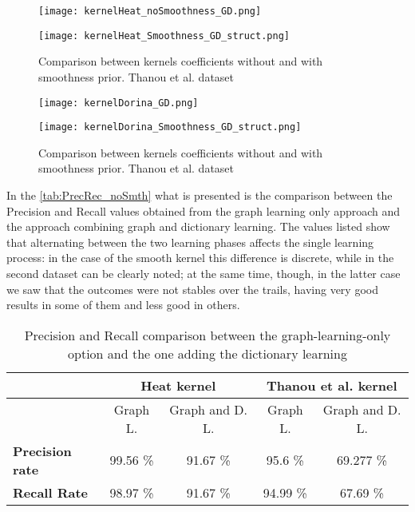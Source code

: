\begin{figure}
  \centering
  \begin{minipage}[c]{.8\textwidth}
    \centering
    \texttt{[image: kernelHeat\_noSmoothness\_GD.png]}
  \end{minipage}
  \begin{minipage}[c]{.8\textwidth}
    \centering
    \texttt{[image: kernelHeat\_Smoothness\_GD\_struct.png]}
  \end{minipage}
  \caption{Comparison between kernels coefficients without and with smoothness prior. Thanou et al.   dataset}
  \label{fig:alphaHeatGD}
\end{figure}

\begin{figure}
  \centering
  \begin{minipage}[c]{.8\textwidth}
    \centering
    \texttt{[image: kernelDorina\_GD.png]}
  \end{minipage}
  \begin{minipage}[c]{.8\textwidth}
    \centering
    \texttt{[image: kernelDorina\_Smoothness\_GD\_struct.png]}
  \end{minipage}
  \caption{Comparison between kernels coefficients without and with smoothness prior. Thanou et al. dataset}
  \label{fig:alphaDorinaGD}
\end{figure}

In the \autoref{tab:PrecRec_noSmth} what is presented is the comparison between the Precision and Recall values obtained from the graph learning only approach and the approach combining graph and dictionary learning. The values listed show that alternating between the two learning phases affects the single learning process: in the case of the smooth kernel this difference is discrete, while in the second dataset can be clearly noted; at the same time, though, in the latter case we saw that the outcomes were not stables over the trails, having very good results in some of them and less good in others.

\begin{table}[htbp]
  \centering
  \begin{tabular}{lcccc}
  &\multicolumn{2}{c}{\textbf{Heat kernel}}&\multicolumn{2}{c}{\textbf{Thanou et al. kernel}}\\
  \toprule
  &Graph L. & Graph and D. L. & Graph L. & Graph and D. L.\\ %
    \midrule
    \textbf{Precision rate} & 99.56 \% & 91.67 \% & 95.6 \% & 69.277 \%\\
    \textbf{Recall Rate} & 98.97 \% &  91.67 \% & 94.99 \% & 67.69 \%\\
    \bottomrule
  \end{tabular}
  \caption{Precision and Recall comparison between the graph-learning-only option and the one adding the dictionary learning}
  \label{tab:PrecRec_noSmth}
\end{table}

